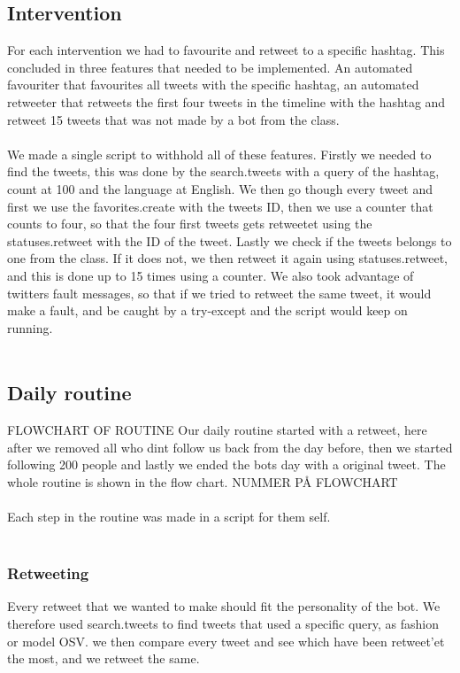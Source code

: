 \subsection{Intervention}
For each intervention we had to favourite and retweet to a specific hashtag. This concluded in three features that needed to be implemented. An automated favouriter that favourites all tweets with the specific hashtag, an automated retweeter that retweets the first four tweets in the timeline with the hashtag and retweet 15 tweets that was not made by a bot from the class.\\
\\
We made a single script to withhold all of these features. Firstly we needed to find the tweets, this was done by the search.tweets with a query of the hashtag, count at 100 and the language at English. We then go though every tweet and first we use the favorites.create with the tweets ID, then we use a counter that counts to four, so that the four first tweets gets retweetet using the statuses.retweet with the ID of the tweet. Lastly we check if the tweets belongs to one from the class. If it does not, we then retweet it again using statuses.retweet, and this is done up to 15 times using a counter. We also took advantage of twitters fault messages, so that if we tried to retweet the same tweet, it would make a fault, and be caught by a try-except and the script would keep on running.\\
\\

\subsection{Daily routine}
FLOWCHART OF ROUTINE
Our daily routine started with a retweet, here after we removed all who dint follow us back from the day before, then we started following 200 people and lastly we ended the bots day with a original tweet. The whole routine is shown in the flow chart. NUMMER PÅ FLOWCHART\\
\\
Each step in the routine was made in a script for them self.\\
\\

\subsubsection{Retweeting}
Every retweet that we wanted to make should fit the personality of the bot. We therefore used search.tweets to find tweets that used a specific query, as fashion or model OSV. we then compare every tweet and see which have been retweet'et the most, and we retweet the same.\\
\\

